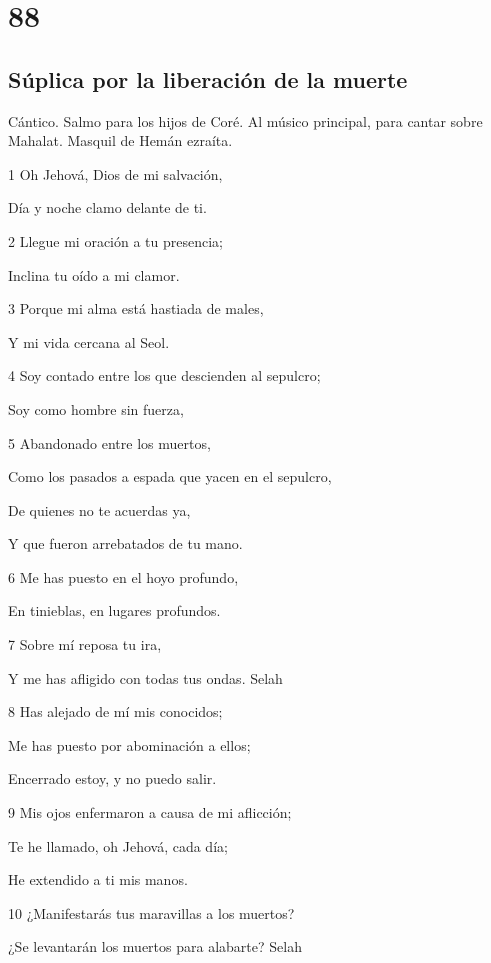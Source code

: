 \chapter{88}

\section*{Súplica por la liberación de la muerte}

\par Cántico. Salmo para los hijos de Coré. Al músico principal, para cantar sobre Mahalat. Masquil de Hemán ezraíta.

\par 1 Oh Jehová, Dios de mi salvación,
\par Día y noche clamo delante de ti.
\par 2 Llegue mi oración a tu presencia;
\par Inclina tu oído a mi clamor.
\par 3 Porque mi alma está hastiada de males,
\par Y mi vida cercana al Seol.
\par 4 Soy contado entre los que descienden al sepulcro;
\par Soy como hombre sin fuerza,
\par 5 Abandonado entre los muertos,
\par Como los pasados a espada que yacen en el sepulcro,
\par De quienes no te acuerdas ya,
\par Y que fueron arrebatados de tu mano.
\par 6 Me has puesto en el hoyo profundo,
\par En tinieblas, en lugares profundos.
\par 7 Sobre mí reposa tu ira,
\par Y me has afligido con todas tus ondas. Selah
\par 8 Has alejado de mí mis conocidos;
\par Me has puesto por abominación a ellos;
\par Encerrado estoy, y no puedo salir.
\par 9 Mis ojos enfermaron a causa de mi aflicción;
\par Te he llamado, oh Jehová, cada día;
\par He extendido a ti mis manos.
\par 10 ¿Manifestarás tus maravillas a los muertos?
\par ¿Se levantarán los muertos para alabarte? Selah
